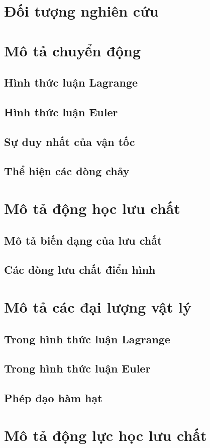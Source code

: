 \documentclass[../../main.tex]{subfiles}
\begin{document}
\section{Đối tượng nghiên cứu}
	
\section{Mô tả chuyển động}
	\subsection{Hình thức luận Lagrange}
		
	\subsection{Hình thức luận Euler}
		
	\subsection{Sự duy nhất của vận tốc}
		
	\subsection{Thể hiện các dòng chảy}
		
\section{Mô tả động học lưu chất}
	\subsection{Mô tả biến dạng của lưu chất}
		
	\subsection{Các dòng lưu chất điển hình}
		
\section{Mô tả các đại lượng vật lý}
	\subsection{Trong hình thức luận Lagrange}
		
	\subsection{Trong hình thức luận Euler}
		
	\subsection{Phép đạo hàm hạt}
		
\section{Mô tả động lực học lưu chất}
	
\end{document}
